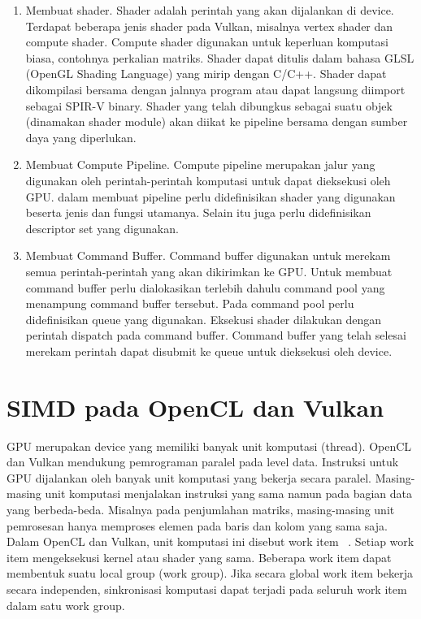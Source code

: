 \begin{enumerate}
\item Membuat shader. Shader adalah perintah yang akan dijalankan di device. Terdapat beberapa jenis shader pada Vulkan, misalnya vertex shader dan compute shader. Compute shader digunakan untuk keperluan komputasi biasa, contohnya perkalian matriks. Shader dapat ditulis dalam bahasa GLSL (OpenGL Shading Language) yang mirip dengan C/C++. Shader dapat dikompilasi bersama dengan jalnnya program atau dapat langsung diimport sebagai SPIR-V binary. Shader yang telah dibungkus sebagai suatu objek (dinamakan shader module) akan diikat ke pipeline bersama dengan sumber daya yang diperlukan.

\item Membuat Compute Pipeline. Compute pipeline merupakan jalur yang digunakan oleh perintah-perintah komputasi untuk dapat dieksekusi oleh GPU. dalam membuat pipeline perlu didefinisikan shader yang digunakan beserta jenis dan fungsi utamanya. Selain itu juga perlu didefinisikan descriptor set yang digunakan.

\item Membuat Command Buffer. Command buffer digunakan untuk merekam semua perintah-perintah yang akan dikirimkan ke GPU. Untuk membuat command buffer perlu dialokasikan terlebih dahulu command pool yang menampung command buffer tersebut. Pada command pool perlu didefinisikan queue yang digunakan. Eksekusi shader dilakukan dengan perintah dispatch pada command buffer. Command buffer yang telah selesai merekam perintah dapat disubmit ke queue untuk dieksekusi oleh device.
\end{enumerate}

\section{SIMD pada OpenCL dan Vulkan}
GPU merupakan device yang memiliki banyak unit komputasi (thread). OpenCL dan Vulkan mendukung pemrograman paralel pada level data. Instruksi untuk GPU dijalankan oleh banyak unit komputasi yang bekerja secara paralel. Masing-masing unit komputasi menjalakan instruksi yang sama namun pada bagian data yang berbeda-beda. Misalnya pada penjumlahan matriks, masing-masing unit pemrosesan hanya memproses elemen pada baris dan kolom yang sama saja. Dalam OpenCL dan Vulkan, unit komputasi ini disebut work item \cite{opencl}~\cite{vkspec}. Setiap work item mengeksekusi kernel atau shader yang sama. Beberapa work item dapat membentuk suatu local group (work group). Jika secara global work item bekerja secara independen, sinkronisasi komputasi dapat terjadi pada seluruh work item dalam satu work group. 

